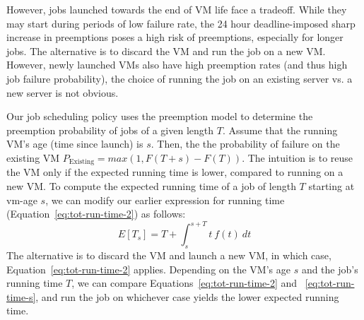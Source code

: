 
However, jobs launched towards the end of VM life face a tradeoff.
While they may start during periods of low failure rate, the 24 hour deadline-imposed sharp increase in preemptions poses a high risk of preemptions, especially for longer jobs.
The alternative is to discard the VM and run the job on a new VM. 
However, newly launched VMs also have high preemption rates (and thus high job failure probability), the choice of running the job on an existing server vs. a new server is not obvious.

Our job scheduling policy uses the preemption model to determine the preemption probability of jobs of a given length $T$. 
Assume that the running VM's age (time since launch) is $s$.
Then, the the probability of failure on the existing VM $P_{\text{Existing}} = max(1, F(T+s) - F(T))$. 
The intuition is to reuse the VM only if the expected running time is lower, compared to running on a new VM. 
To compute the expected running time of a job of length $T$ starting at vm-age $s$, we can modify our earlier expression for running time (Equation~\ref{eq:tot-run-time-2}) as follows:
\begin{equation}
  \label{eq:tot-run-time-s}
    E[T_s]  = T + \int_{s}^{s+T} t~f(t)~dt
  \end{equation}
  The alternative is to discard the VM and launch a new VM, in which case, Equation~\ref{eq:tot-run-time-2} applies.
Depending on the VM's age $s$ and the job's running time $T$, we can compare Equations~\ref{eq:tot-run-time-2} and ~\ref{eq:tot-run-time-s}, and run the job on whichever case yields the lower expected running time. 

\begin{comment}
Our job scheduling policy uses the preemption model to determine the preemption probability of jobs of a given length $T$. 
Assume that the running VM's age (time since launch) is $s$. 
Then, the the probability of failure on the existing VM $P_{\text{Existing}} = max(1, F(T+s) - F(T))$. 
The alternative is to discard the VM and launch a new VM, in which case, the failure probability is $P_{\text{New}} = F(T)$.
Depending on the VM's age $s$ and the job's running time $T$, we can compare $P_{\text{Existing}}$ and $P_{\text{New}}$, and run the job on whichever case yields the lower failure probability. 
\end{comment}


